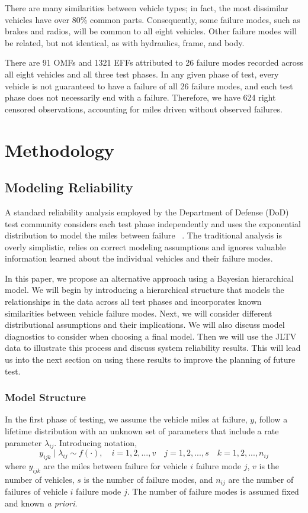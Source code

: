 \documentclass[12pt]{article}
\begin{document}
There are many similarities between vehicle types; in fact, the most dissimilar
vehicles have over 80\% common parts. Consequently, some failure modes, such as
brakes and radios, will be common to all eight vehicles. Other failure modes
will be related, but not identical, as with hydraulics, frame, and body.

There are 91 OMFs and 1321 EFFs attributed to 26 failure modes recorded across
all eight vehicles and all three test phases. In any given phase of test, every
vehicle is not guaranteed to have a failure of all 26 failure modes, and each
test phase does not necessarily end with a failure. Therefore, we have 624 right
censored observations, accounting for miles driven without observed failures.

\section{Methodology}

\subsection{Modeling Reliability}
A standard reliability analysis employed by the Department of Defense (DoD) test
community considers each test phase independently and uses the exponential
distribution to model the miles between failure ~\cite{ref1}. The traditional
analysis is overly simplistic, relies on correct modeling assumptions
and ignores valuable information learned about the individual vehicles and their
failure modes.

In this paper, we propose an alternative approach using a Bayesian hierarchical
model.  We will begin by introducing a hierarchical structure that models the
relationships in the data across all test phases and incorporates known
similarities between vehicle failure modes.  Next, we will consider different
distributional assumptions and their implications.  We will also
discuss model diagnostics to consider when choosing a final model. Then we will
use the JLTV data to illustrate this process and discuss system reliability
results. This will lead us into the next section on using these results to
improve the planning of future test.

\subsubsection{Model Structure}
In the first phase of testing, we assume the vehicle miles at failure, $y$,
follow a lifetime distribution with an unknown set of parameters that include
a rate parameter $\lambda_{ij}$.
Introducing notation,
\begin{equation}
y_{ijk}\mid\lambda_{ij}\sim f(\cdot), \quad i = 1,2,...,v \quad
j=1,2,...,s \quad k=1,2,...,n_{ij}
\end{equation}
where $y_{ijk}$ are the miles between failure for vehicle $i$ failure mode $j$,
$v$ is the number of vehicles, $s$ is the number of failure modes, and $n_{ij}$
are the number of failures of vehicle $i$ failure mode $j$. The number of
failure modes is assumed fixed and known \textit{a priori}.
\end{document}

